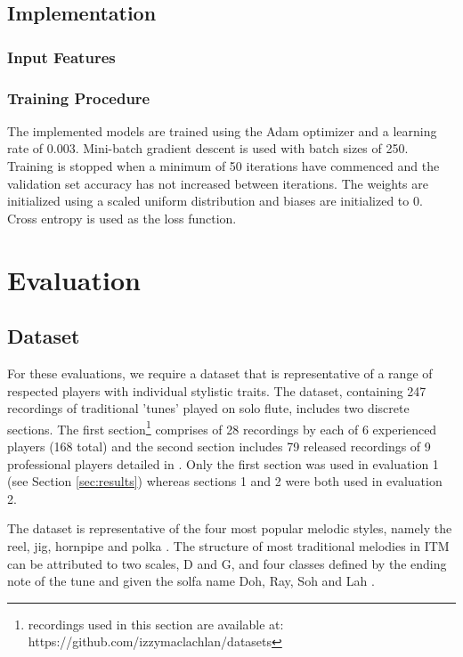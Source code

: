 \documentclass{article}
\begin{document}
{{\subsection{Implementation}

\subsubsection{Input Features}



\subsubsection{Training Procedure}

The implemented models are trained using the Adam optimizer and a learning rate of 0.003.  Mini-batch gradient descent is used with batch sizes of 250. Training is stopped when a minimum of 50 iterations have commenced and the
validation set accuracy has not increased between iterations. The weights are initialized using a scaled uniform distribution \cite{DBLP:journals/corr/Sussillo14}
and biases are initialized to 0. Cross entropy is used as the loss function.


\section{Evaluation} \label{sec:evaluation}

\subsection{Dataset}\label{sec:dataset}
For these evaluations, we require a dataset that is representative of a range of respected players with individual stylistic traits. The dataset, containing 247 recordings of traditional 'tunes' played on solo flute, includes two discrete sections. The first section\footnote{recordings used in this section are available at: https://github.com/izzymaclachlan/datasets} comprises of 28 recordings by each of 6 experienced players (168 total) and the second section includes 79 released recordings of 9 professional players detailed in \cite{ali-maclachlan_islah_note_2016}. Only the first section was used in evaluation 1 (see Section \ref{sec:results}) whereas sections 1 and 2 were both used in evaluation 2.

The dataset is representative of the four most popular melodic styles, namely the reel, jig, hornpipe and polka \cite{hast_music_2004}. The structure of most traditional melodies in ITM can be attributed to two scales, D and G, and four classes defined by the ending note of the tune and given the solfa name Doh, Ray, Soh and Lah \cite{breathnach_folk_1996, o_canainn_traditional_1978}. 

}}
\end{document}
